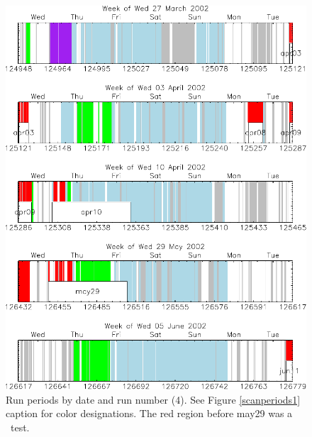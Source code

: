 \documentclass[aps,prd,preprint,superscriptaddress,tightenlines,nofootinbib,floatfix]{revtex4}
\begin{document}
\begin{figure}[p]
  \includegraphics[width=0.95\linewidth]{scan_periods4}
  \caption{\label{scanperiods4} Run periods by date and run number
  (4).  See Figure \ref{scanperiods1} caption for color
  designations.  The red region before may29 was a \utwo\ test.}
\end{figure}
\end{document}
